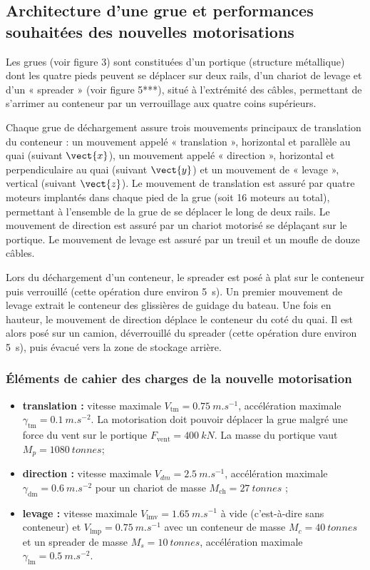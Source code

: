 \documentclass[10pt,fleqn]{article} %
\begin{document}
\subsection{Architecture d’une grue et performances souhaitées des nouvelles motorisations}
Les grues (voir figure 3) sont constituées d’un portique (structure métallique) dont les quatre pieds peuvent se
déplacer sur deux rails, d’un chariot de levage et d’un « spreader » (voir figure 5***), situé à l’extrémité des câbles,
permettant de s’arrimer au conteneur par un verrouillage aux quatre coins supérieurs.

Chaque grue de déchargement assure trois mouvements principaux de translation du conteneur : un mouvement
appelé « translation », horizontal et parallèle au quai (suivant $\vect{x}$), un mouvement appelé « direction », horizontal
et perpendiculaire au quai (suivant $\vect{y}$) et un mouvement de « levage », vertical (suivant $\vect{z}$).
Le mouvement de translation est assuré par quatre moteurs implantés dans chaque pied de la grue (soit 16
moteurs au total), permettant à l’ensemble de la grue de se déplacer le long de deux rails. Le mouvement de
direction est assuré par un chariot motorisé se déplaçant sur le portique. Le mouvement de levage est assuré par
un treuil et un moufle de douze câbles.

Lors du déchargement d’un conteneur, le spreader est posé à plat sur le conteneur puis verrouillé (cette opération
dure environ \SI{5}{s}). Un premier mouvement de levage extrait le conteneur des glissières de guidage du bateau.
Une fois en hauteur, le mouvement de direction déplace le conteneur du coté du quai. Il est alors posé sur un
camion, déverrouillé du spreader (cette opération dure environ \SI{5}{s}), puis évacué vers la zone de stockage arrière.

\subsubsection*{Éléments de cahier des charges de la nouvelle motorisation}
\begin{itemize}
\item \textbf{translation :} vitesse maximale $V_{\text{tm}} = \SI{0,75}{m.s^{-1}}$, accélération maximale 
$\gamma_{\text{tm}} = \SI{0,1}{m.s^{-2}}$. La motorisation doit pouvoir déplacer la grue malgré une force du vent sur le portique $F_{\text{vent}} = \SI{400}{kN}$. La masse du portique vaut $M_p = \SI{1 080}{tonnes}$;
\item \textbf{direction :} vitesse maximale $V_{dm} = \SI{2,5}{m.s^{-1}}$, accélération maximale 
$\gamma_{\text{dm}} = \SI{0,6}{m.s^{-2}}$ pour un chariot de masse $M_{\text{ch}}= \SI{27}{tonnes}$ ;
\item \textbf{levage :} vitesse maximale $V_{\text{lmv}} = \SI{1,65}{m.s^{-1}}$ à vide (c’est-à-dire sans conteneur) et $V_{\text{lmp}} = \SI{0,75}{m.s^{-1}}$ avec un conteneur de masse $M_c = \SI{40}{tonnes}$  et un spreader de masse $M_s = \SI{10}{tonnes}$, accélération maximale $\gamma_{\text{lm}} = \SI{0,5}{m.s^{-2}}$.
\end{itemize}
\end{document}
